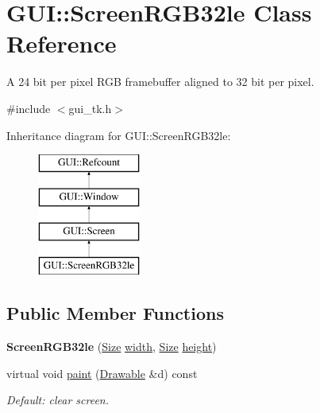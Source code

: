 \hypertarget{classGUI_1_1ScreenRGB32le}{\section{G\-U\-I\-:\-:Screen\-R\-G\-B32le Class Reference}
\label{classGUI_1_1ScreenRGB32le}
}


A 24 bit per pixel R\-G\-B framebuffer aligned to 32 bit per pixel.  




{\ttfamily \#include $<$gui\-\_\-tk.\-h$>$}

Inheritance diagram for G\-U\-I\-:\-:Screen\-R\-G\-B32le\-:\begin{figure}[H]
\begin{center}
\leavevmode
\includegraphics[height=4.000000cm]{classGUI_1_1ScreenRGB32le}
\end{center}
\end{figure}
\subsection*{Public Member Functions}
\begin{DoxyCompactItemize}
\item 
\hypertarget{classGUI_1_1ScreenRGB32le_a99133fcf62ee39b426d28be3c5b798b6}{{\bfseries Screen\-R\-G\-B32le} (\hyperlink{namespaceGUI_a10b6232e08729baa0bd211a86a69ce36}{Size} \hyperlink{classGUI_1_1Window_a6cd42974c2b9239d05dac79d284f427d}{width}, \hyperlink{namespaceGUI_a10b6232e08729baa0bd211a86a69ce36}{Size} \hyperlink{classGUI_1_1Window_a5bbb3975f91e7572fc1a91c44e59d212}{height})}\label{classGUI_1_1ScreenRGB32le_a99133fcf62ee39b426d28be3c5b798b6}

\item 
\hypertarget{classGUI_1_1ScreenRGB32le_af40307f3d0a37645b9ce73d9f95ba557}{virtual void \hyperlink{classGUI_1_1ScreenRGB32le_af40307f3d0a37645b9ce73d9f95ba557}{paint} (\hyperlink{classGUI_1_1Drawable}{Drawable} \&d) const }\label{classGUI_1_1ScreenRGB32le_af40307f3d0a37645b9ce73d9f95ba557}

\begin{DoxyCompactList}\small\item\em Default\-: clear screen. \end{DoxyCompactList}\end{DoxyCompactItemize}

